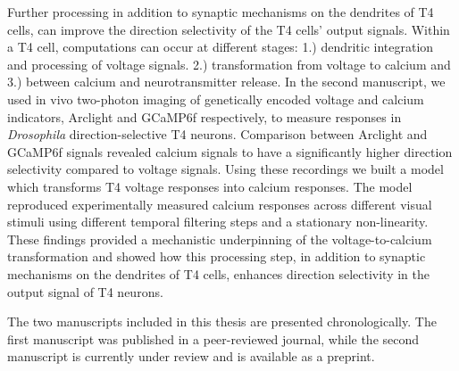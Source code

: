 Further processing in addition to synaptic mechanisms on the dendrites of T4 cells, can improve the direction selectivity of the T4 cells' output signals. Within a T4 cell, computations can occur at different stages: 1.) dendritic integration and processing of voltage signals. 2.) transformation from voltage to calcium and 3.) between calcium and neurotransmitter release. In the second manuscript, we used in vivo two-photon imaging of genetically encoded voltage and calcium indicators, Arclight and GCaMP6f respectively, to measure responses in \textit{Drosophila} direction-selective T4 neurons. Comparison between Arclight and GCaMP6f signals revealed calcium signals to have a significantly higher direction selectivity compared to voltage signals. Using these recordings we built a model which transforms T4 voltage responses into calcium responses. The model reproduced experimentally measured calcium responses across different visual stimuli using different temporal filtering steps and a stationary non-linearity. These findings provided a mechanistic underpinning of the voltage-to-calcium transformation and showed how this processing step, in addition to synaptic mechanisms on the dendrites of T4 cells, enhances direction selectivity in the output signal of T4 neurons.

The two manuscripts included in this thesis are presented chronologically. The first manuscript was published in a peer-reviewed journal, while the second manuscript is currently under review and is available as a preprint. 


% 


\vfill


\endgroup			

\vfill

